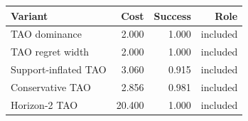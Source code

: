 \begin{tabular}{lrrr}
\toprule
Variant & Cost & Success & Role \\
\midrule
TAO dominance & 2.000 & 1.000 & included \\
TAO regret width & 2.000 & 1.000 & included \\
Support-inflated TAO & 3.060 & 0.915 & included \\
Conservative TAO & 2.856 & 0.981 & included \\
Horizon-2 TAO & 20.400 & 1.000 & included \\
\bottomrule
\end{tabular}
